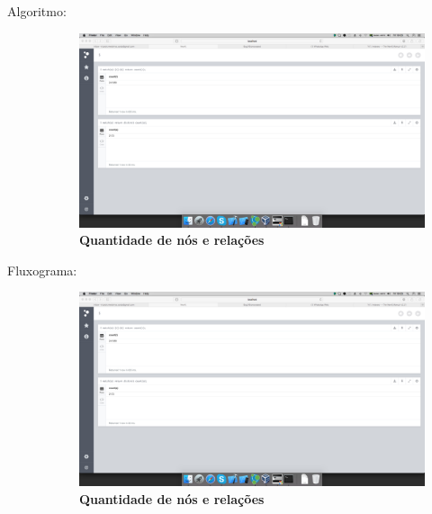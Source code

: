 \documentclass[a4paper, 12pt]{article}
\begin{document}
\begin{enumerate}
\begin{description}
      \item[Algoritmo:]
         \begin{figure}[H]
         \centering
         \includegraphics[width=1\textwidth]{1}
         \caption[1 - Quantidade de nós e relações]{\textbf{Quantidade de nós e relações}}
         \end{figure} 
        
       \item[Fluxograma:]
         \begin{figure}[H]
         \centering
         \includegraphics[width=1\textwidth]{1}
         \caption[1 - Quantidade de nós e relações]{\textbf{Quantidade de nós e relações}}
         \end{figure} 
         

\end{description}
\end{enumerate}
\end{document}
